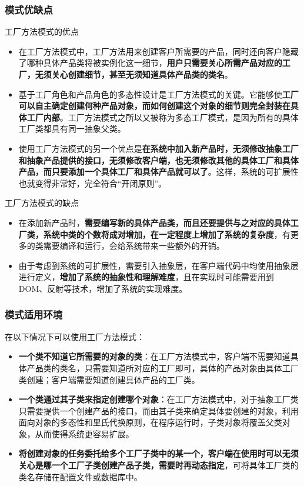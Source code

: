\subsubsection{模式优缺点}
工厂方法模式的优点
\begin{itemize}
    \item 在工厂方法模式中，工厂方法用来创建客户所需要的产品，同时还向客户隐藏了哪种具体产品类将被实例化这一细节，\textbf{用户只需要关心所需产品对应的工厂，无须关心创建细节，甚至无须知道具体产品类的类名}。
    \item 基于工厂角色和产品角色的多态性设计是工厂方法模式的关键。它能够使\textbf{工厂可以自主确定创建何种产品对象，而如何创建这个对象的细节则完全封装在具体工厂内部}。工厂方法模式之所以又被称为多态工厂模式，是因为所有的具体工厂类都具有同一抽象父类。
    \item 使用工厂方法模式的另一个优点是\textbf{在系统中加入新产品时，无须修改抽象工厂和抽象产品提供的接口，无须修改客户端，也无须修改其他的具体工厂和具体产品，而只要添加一个具体工厂和具体产品就可以了}。这样，系统的可扩展性也就变得非常好，完全符合“开闭原则”。
\end{itemize}

工厂方法模式的缺点
\begin{itemize}
    \item 在添加新产品时，\textbf{需要编写新的具体产品类，而且还要提供与之对应的具体工厂类，系统中类的个数将成对增加，在一定程度上增加了系统的复杂度}，有更多的类需要编译和运行，会给系统带来一些额外的开销。
    \item 由于考虑到系统的可扩展性，需要引入抽象层，在客户端代码中均使用抽象层进行定义，\textbf{增加了系统的抽象性和理解难度}，且在实现时可能需要用到DOM、反射等技术，增加了系统的实现难度。
\end{itemize}

\subsubsection{模式适用环境}
在以下情况下可以使用工厂方法模式：
\begin{itemize}
    \item \textbf{一个类不知道它所需要的对象的类}：在工厂方法模式中，客户端不需要知道具体产品类的类名，只需要知道所对应的工厂即可，具体的产品对象由具体工厂类创建；客户端需要知道创建具体产品的工厂类。
    \item \textbf{一个类通过其子类来指定创建哪个对象}：在工厂方法模式中，对于抽象工厂类只需要提供一个创建产品的接口，而由其子类来确定具体要创建的对象，利用面向对象的多态性和里氏代换原则，在程序运行时，子类对象将覆盖父类对象，从而使得系统更容易扩展。
    \item \textbf{将创建对象的任务委托给多个工厂子类中的某一个，客户端在使用时可以无须关心是哪一个工厂子类创建产品子类，需要时再动态指定}，可将具体工厂类的类名存储在配置文件或数据库中。
\end{itemize}


